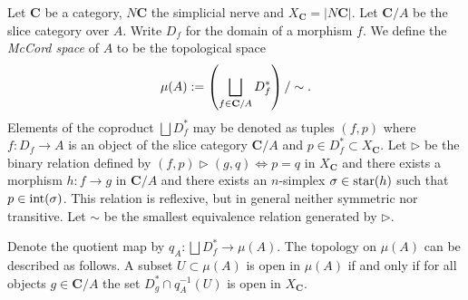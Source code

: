 
\begin{definition}
\label{def:star sieve}
Let $\mathbf{C}$ be a category, $N \mathbf{C}$ the simplicial nerve and $X_\mathbf{C} = |N \mathbf{C} |$. Let $\mathbf{C}/A$ be the slice category over $A$. Write $D_f$ for the domain of a morphism $f$. We define the \emph{McCord space} of $A$ to be the topological space
\[ \operatorname{\mu}(A) := \left(\bigsqcup_{f \in \mathbf{C}/A} D_f^* \right) / \sim. \]
Elements of the coproduct $\bigsqcup D_f^*$ may be denoted as tuples $(f,p)$ where $f : D_f \to A$ is an object of the slice category $\mathbf{C}/A$ and $p \in D_f^* \subset X_{\mathbf{C}}$. 
Let $\rhd$ be the binary relation defined by $(f,p) \rhd (g,q) \iff p = q$ in $X_{\mathbf{C}}$ and there exists a morphism $h : f \to g$ in $\mathbf{C}/A$ and there exists an $n$-simplex $\sigma \in \operatorname{star}(h)$ such that $p \in \operatorname{int}(\sigma)$.
This relation is reflexive, but in general neither symmetric nor transitive. Let $\sim$ be the smallest equivalence relation generated by $\rhd$.
\end{definition}

Denote the quotient map by $q_A : \bigsqcup D_f^* \to \mu(A)$. The topology on $\mu(A)$ can be described as follows. A subset $U \subset \mu(A)$ is open in $\mu(A)$ if and only if for all objects $g \in \mathbf{C}/A$ the set $D_g^* \cap q^{-1}_A(U)$ is open in $X_{\mathbf{C}}$.


